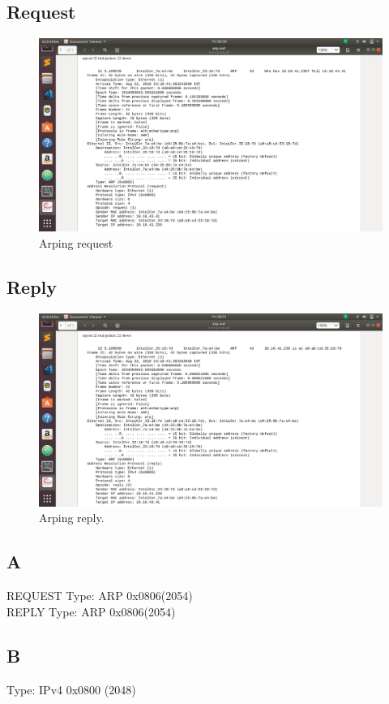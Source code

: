 \documentclass{article}
\begin{document}
\subsection{Request}
\begin{figure}[H]
 \centering
 \includegraphics[width=1.0\textwidth]{../Q7/request.png}
 \caption{\label{fig:REQUEST}Arping request}
 \end{figure}
\subsection{Reply}
 \begin{figure}[H]
 \centering
 \includegraphics[width=1.0\textwidth]{../Q7/response.png}
 \caption{\label{fig:REPLY}Arping reply.}
 \end{figure}
\subsection{A}
REQUEST Type: ARP 0x0806(2054) \\
REPLY Type:  ARP 0x0806(2054)
\subsection{B}
Type: IPv4 0x0800 (2048)
\end{document}
